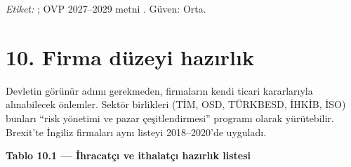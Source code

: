 \emph{Etiket:} \etiketH{}; OVP 2027--2029 metni \etiketV{}. Güven: Orta.

\hypertarget{02c_hazirlik-10-firma-duxfczeyi-hazux131rlux131k}{%
\section{10. Firma düzeyi hazırlık}\label{02c_hazirlik-10-firma-duxfczeyi-hazux131rlux131k}}

Devletin görünür adımı gerekmeden, firmaların kendi ticari kararlarıyla alınabilecek önlemler. Sektör birlikleri (TİM, OSD, TÜRKBESD, İHKİB, İSO) bunları ``risk yönetimi ve pazar çeşitlendirmesi'' programı olarak yürütebilir. Brexit'te İngiliz firmaları aynı listeyi 2018--2020'de uyguladı.


\textbf{Tablo 10.1 --- İhracatçı ve ithalatçı hazırlık listesi}

\nopagebreak[4]

\begingroup\gbtablo\small

